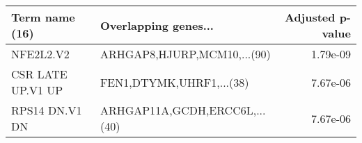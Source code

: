 \begin{tabular}{llr}
\toprule
   Term name (16) &          Overlapping genes... &  Adjusted p-value \\
\midrule
        NFE2L2.V2 &   ARHGAP8,HJURP,MCM10,...(90) &          1.79e-09 \\
CSR LATE UP.V1 UP &      FEN1,DTYMK,UHRF1,...(38) &          7.67e-06 \\
   RPS14 DN.V1 DN & ARHGAP11A,GCDH,ERCC6L,...(40) &          7.67e-06 \\
\bottomrule
\end{tabular}
